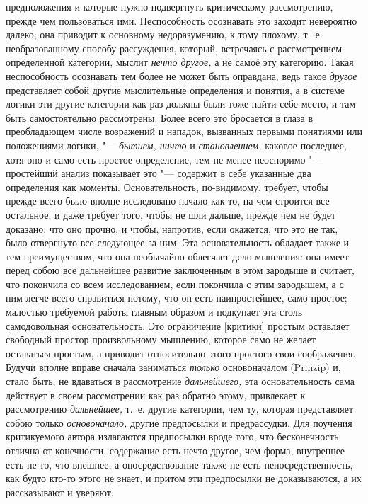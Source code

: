 предположения и которые нужно подвергнуть критическому рассмотрению, прежде чем
пользоваться ими. Неспособность осознавать это заходит невероятно далеко; она
приводит к основному недоразумению, к тому плохому, т.~е. необразованному
способу рассуждения, который, встречаясь с рассмотрением определенной
категории, мыслит {\em нечто другое,} а не самоё эту категорию. Такая неспособность
осознавать тем более не может быть оправдана, ведь такое {\em другое} представляет собой другие
мыслительные определения и понятия, а в системе логики эти другие категории
как раз должны были тоже найти себе место, и там быть
самостоятельно рассмотрены. Более всего это бросается в глаза в
преобладающем числе возражений и нападок, вызванных первыми понятиями или
положениями логики, "--- {\em бытием, ничто} и {\em становлением,} каковое
последнее, хотя оно и само есть простое определение, тем не менее неоспоримо
"--- простейший анализ показывает это "--- содержит в себе указанные два
определения как моменты. Основательность, по-видимому, требует, чтобы прежде
всего было вполне исследовано начало как то, на чем строится все остальное, и
даже требует того, чтобы не шли дальше, прежде чем не будет доказано, что оно
прочно, и чтобы, напротив, если окажется, что это не так, было отвергнуто все
следующее за ним. Эта основательность обладает также и тем преимуществом, что
она необычайно облегчает дело мышления: она имеет перед собою все дальнейшее
развитие заключенным в этом зародыше и считает, что покончила со всем
исследованием, если покончила с этим зародышем, а с ним легче всего справиться
потому, что он есть наипростейшее, само простое; малостью требуемой работы
главным образом и подкупает эта столь самодовольная основательность. Это
ограничение [критики] простым оставляет свободный простор произвольному
мышлению, которое само не желает оставаться простым, а приводит относительно
этого простого свои соображения. Будучи вполне вправе сначала заниматься
{\em только} основоначалом (Prinzip) и, стало быть, не вдаваться в рассмотрение
{\em дальнейшего,} эта основательность сама действует в своем рассмотрении как
раз обратно этому, привлекает к рассмотрению {\em дальнейшее,} т.~е. другие
категории, чем ту, которая представляет собою только {\em основоначало,} другие
предпосылки и предрассудки. Для поучения критикуемого автора излагаются
предпосылки вроде того, что бесконечность отлична от конечности, содержание
есть нечто другое, чем форма, внутреннее есть не то, что внешнее, а
опосредствование также не есть непосредственность, как будто кто-то этого не
знает, и притом эти предпосылки не доказываются, а их рассказывают и уверяют,
